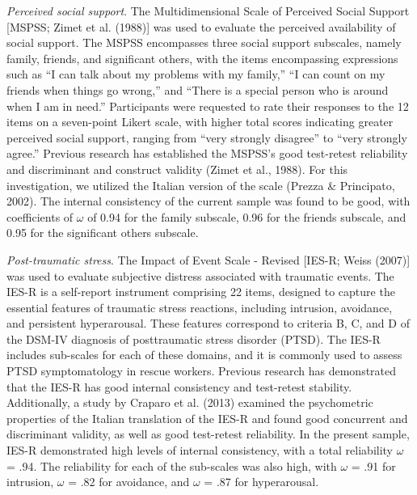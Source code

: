 \documentclass[
  man]{apa7}
\begin{document}
\emph{Perceived social support}. The Multidimensional Scale of Perceived Social Support {[}MSPSS; Zimet et al. (1988){]} was used to evaluate the perceived availability of social support. The MSPSS encompasses three social support subscales, namely family, friends, and significant others, with the items encompassing expressions such as ``I can talk about my problems with my family,'' ``I can count on my friends when things go wrong,'' and ``There is a special person who is around when I am in need.'' Participants were requested to rate their responses to the 12 items on a seven-point Likert scale, with higher total scores indicating greater perceived social support, ranging from ``very strongly disagree'' to ``very strongly agree.'' Previous research has established the MSPSS's good test-retest reliability and discriminant and construct validity (Zimet et al., 1988). For this investigation, we utilized the Italian version of the scale (Prezza \& Principato, 2002). The internal consistency of the current sample was found to be good, with coefficients of \(\omega\) of 0.94 for the family subscale, 0.96 for the friends subscale, and 0.95 for the significant others subscale.

\emph{Post-traumatic stress}. The Impact of Event Scale - Revised {[}IES-R; Weiss (2007){]} was used to evaluate subjective distress associated with traumatic events. The IES-R is a self-report instrument comprising 22 items, designed to capture the essential features of traumatic stress reactions, including intrusion, avoidance, and persistent hyperarousal. These features correspond to criteria B, C, and D of the DSM-IV diagnosis of posttraumatic stress disorder (PTSD). The IES-R includes sub-scales for each of these domains, and it is commonly used to assess PTSD symptomatology in rescue workers. Previous research has demonstrated that the IES-R has good internal consistency and test-retest stability. Additionally, a study by Craparo et al. (2013) examined the psychometric properties of the Italian translation of the IES-R and found good concurrent and discriminant validity, as well as good test-retest reliability.
In the present sample, IES-R demonstrated high levels of internal consistency, with a total reliability \(\omega\) = .94. The reliability for each of the sub-scales was also high, with \(\omega\) = .91 for intrusion, \(\omega\) = .82 for avoidance, and \(\omega\) = .87 for hyperarousal.
\end{document}
